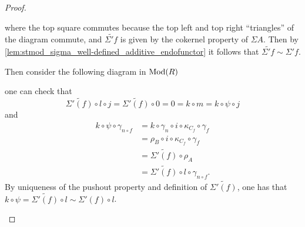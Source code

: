 \begin{proof}
\begin{enumerate}[label={(\bfseries TR\arabic*)}]
{\begin{center}
            \end{center}
            where the top square commutes because the top left and top right ``triangles'' of the diagram commute, and \( \widetilde{\Sigma' f} \) is given by the cokernel property of \( \Sigma A \). Then by \autoref{lem:stmod_sigma_well-defined_additive_endofunctor} it follows that \( \widetilde{\Sigma' f} \sim \Sigma' f \).

            Then consider the following diagram in \( \operatorname{Mod}(R) \)
            \begin{center}
            \end{center}
            one can check that
            \[
                \widetilde{\Sigma'(f)} \circ l \circ j = \widetilde{\Sigma'(f)} \circ 0 = 0 = k \circ m = k \circ \psi \circ j
            \]
            and
            \begin{align*}
                k \circ \psi \circ \gamma_{n \circ f} &= k \circ \gamma_n \circ i \circ \kappa_{C_f} \circ \gamma_f \\
                &= \rho_B \circ i \circ \kappa_{C_f} \circ \gamma_f \\
                &= \widetilde{\Sigma'(f)} \circ \rho_A \\
                &= \widetilde{\Sigma'(f)} \circ l \circ \gamma_{n \circ f}.
            \end{align*}
            By uniqueness of the pushout property and definition of \( \widetilde{\Sigma'(f)} \), one has that \( k \circ \psi = \widetilde{\Sigma'(f)} \circ l \sim \Sigma'(f) \circ l \).
                
}
\end{enumerate}
\end{proof}
